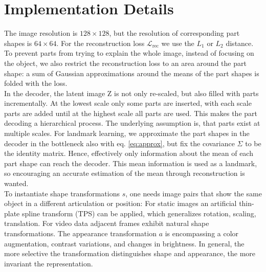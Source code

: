 	\section{Implementation Details}\label{sec:implementationdetails}
		The image resolution is $128 \times 128$, but the resolution of corresponding part shapes is $ 64 \times 64$.
		For the reconstruction  loss $\mathcal{L}_\text{rec}$ we use the $L_1$ or $L_2$ distance.
		To prevent parts from trying to explain the whole image, instead of focusing on the object, we also restrict the reconstruction loss to an area around the part shape: a sum of Gaussian approximations around the means of the part shapes is folded with the loss.\\
		In the decoder, the latent image Z is not only re-scaled, but also filled with parts incrementally.
		At the lowest scale only some parts are inserted, with each scale parts are added until at the highest scale all parts are used. This makes the part decoding a hierarchical process. The underlying assumption is, that parts exist at multiple scales.
		For landmark learning, we approximate the part shapes in the decoder in the bottleneck also with eq. \ref{eq:approx}, but fix the covariance $\Sigma$ to be the identity matrix.
		Hence, effectively only information about the mean of each part shape can reach the decoder. This mean information is used as a landmark, so encouraging an accurate estimation of the mean through reconstruction is wanted.\\
		To instantiate shape transformations $s$, one needs image pairs that show the same object in a different articulation or position: For static images an artificial thin-plate spline transform (TPS) can be applied, which generalizes rotation, scaling, translation.
		For video data adjacent frames exhibit natural shape transformations.
		The appearance transformation $a$ is encompassing a color augmentation, contrast variations, and changes in brightness.
		In general, the more selective the transformation distinguishes shape and appearance, the more invariant the representation.
